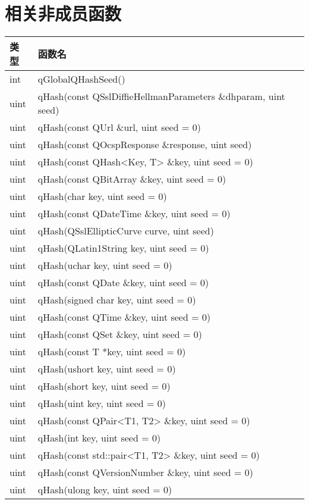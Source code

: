 \section{相关非成员函数}

\begin{longtable}{|l|l|}
\hline
类型	&函数名\\
\hline
int& 	qGlobalQHashSeed()\\
\hline
uint& 	qHash(const QSslDiffieHellmanParameters \&dhparam, uint
      seed)\\
\hline
uint& 	qHash(const QUrl \&url, uint seed = 0)\\
\hline
uint& 	qHash(const QOcspResponse \&response, uint seed)\\
\hline
uint& 	qHash(const QHash<Key, T> \&key, uint seed = 0)\\
\hline
uint& 	qHash(const QBitArray \&key, uint seed = 0)\\
\hline
uint& 	qHash(char key, uint seed = 0)\\
\hline
uint& 	qHash(const QDateTime \&key, uint seed = 0)\\
\hline
uint& 	qHash(QSslEllipticCurve curve, uint seed)\\
\hline
uint& 	qHash(QLatin1String key, uint seed = 0)\\
\hline
uint& 	qHash(uchar key, uint seed = 0)\\
\hline
uint& 	qHash(const QDate \&key, uint seed = 0)\\
\hline
uint& 	qHash(signed char key, uint seed = 0)\\
\hline
uint& 	qHash(const QTime \&key, uint seed = 0)\\
\hline
uint& 	qHash(const QSet \&key, uint seed = 0)\\
\hline
uint& 	qHash(const T *key, uint seed = 0)\\
\hline
uint& 	qHash(ushort key, uint seed = 0)\\
\hline
uint& 	qHash(short key, uint seed = 0)\\
\hline
uint& 	qHash(uint key, uint seed = 0)\\
\hline
uint& 	qHash(const QPair<T1, T2> \&key, uint seed = 0)\\
\hline
uint& 	qHash(int key, uint seed = 0)\\
\hline
uint& 	qHash(const std::pair<T1, T2> \&key, uint seed = 0)\\
\hline
uint& 	qHash(const QVersionNumber \&key, uint seed = 0)\\
\hline
uint& 	qHash(ulong key, uint seed = 0)\\

\end{longtable}
